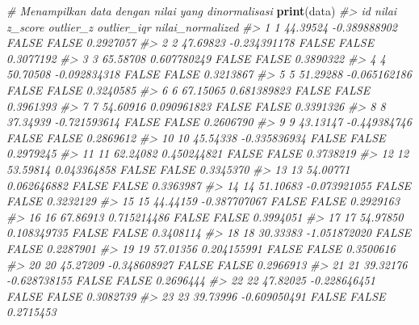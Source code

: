 \documentclass[
  oneside]{book}
\newenvironment{Shaded}{\begin{snugshade}}{\end{snugshade}}
\newcommand{\CommentTok}[1]{\textcolor[rgb]{0.56,0.35,0.01}{\textit{#1}}}
\newcommand{\FunctionTok}[1]{\textcolor[rgb]{0.13,0.29,0.53}{\textbf{#1}}}
\newcommand{\NormalTok}[1]{#1}
\begin{document}
\begin{Shaded}
\begin{Highlighting}[]
\CommentTok{\# Menampilkan data dengan nilai yang dinormalisasi}
\FunctionTok{print}\NormalTok{(data)}
\CommentTok{\#\textgreater{}      id     nilai      z\_score outlier\_z outlier\_iqr nilai\_normalized}
\CommentTok{\#\textgreater{} 1     1  44.39524 {-}0.389888902     FALSE       FALSE        0.2927057}
\CommentTok{\#\textgreater{} 2     2  47.69823 {-}0.234391178     FALSE       FALSE        0.3077192}
\CommentTok{\#\textgreater{} 3     3  65.58708  0.607780249     FALSE       FALSE        0.3890322}
\CommentTok{\#\textgreater{} 4     4  50.70508 {-}0.092834318     FALSE       FALSE        0.3213867}
\CommentTok{\#\textgreater{} 5     5  51.29288 {-}0.065162186     FALSE       FALSE        0.3240585}
\CommentTok{\#\textgreater{} 6     6  67.15065  0.681389823     FALSE       FALSE        0.3961393}
\CommentTok{\#\textgreater{} 7     7  54.60916  0.090961823     FALSE       FALSE        0.3391326}
\CommentTok{\#\textgreater{} 8     8  37.34939 {-}0.721593614     FALSE       FALSE        0.2606790}
\CommentTok{\#\textgreater{} 9     9  43.13147 {-}0.449384746     FALSE       FALSE        0.2869612}
\CommentTok{\#\textgreater{} 10   10  45.54338 {-}0.335836934     FALSE       FALSE        0.2979245}
\CommentTok{\#\textgreater{} 11   11  62.24082  0.450244821     FALSE       FALSE        0.3738219}
\CommentTok{\#\textgreater{} 12   12  53.59814  0.043364858     FALSE       FALSE        0.3345370}
\CommentTok{\#\textgreater{} 13   13  54.00771  0.062646882     FALSE       FALSE        0.3363987}
\CommentTok{\#\textgreater{} 14   14  51.10683 {-}0.073921055     FALSE       FALSE        0.3232129}
\CommentTok{\#\textgreater{} 15   15  44.44159 {-}0.387707067     FALSE       FALSE        0.2929163}
\CommentTok{\#\textgreater{} 16   16  67.86913  0.715214486     FALSE       FALSE        0.3994051}
\CommentTok{\#\textgreater{} 17   17  54.97850  0.108349735     FALSE       FALSE        0.3408114}
\CommentTok{\#\textgreater{} 18   18  30.33383 {-}1.051872020     FALSE       FALSE        0.2287901}
\CommentTok{\#\textgreater{} 19   19  57.01356  0.204155991     FALSE       FALSE        0.3500616}
\CommentTok{\#\textgreater{} 20   20  45.27209 {-}0.348608927     FALSE       FALSE        0.2966913}
\CommentTok{\#\textgreater{} 21   21  39.32176 {-}0.628738155     FALSE       FALSE        0.2696444}
\CommentTok{\#\textgreater{} 22   22  47.82025 {-}0.228646451     FALSE       FALSE        0.3082739}
\CommentTok{\#\textgreater{} 23   23  39.73996 {-}0.609050491     FALSE       FALSE        0.2715453}

\end{Highlighting}
\end{Shaded}
\end{document}
